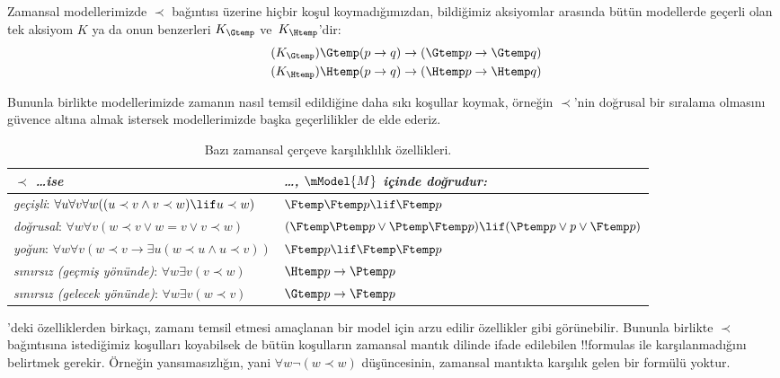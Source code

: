 



Zamansal modellerimizde $\prec$ bağıntısı üzerine hiçbir koşul
koymadığımızdan, bildiğimiz aksiyomlar arasında bütün modellerde geçerli olan
tek aksiyom $K$ ya da onun benzerleri $K_{\Gtemp}$ ve~$K_{\Htemp}$'dir:
\begin{align*}
\tag{$K_{\Gtemp}$}  \Gtemp (p \to q) & \to (\Gtemp p \to \Gtemp q)\\
\tag{$K_{\Htemp}$}  \Htemp (p \to q) & \to (\Htemp p \to \Htemp q)
\end{align*}

Bununla birlikte modellerimizde zamanın nasıl temsil edildiğine daha sıkı
koşullar koymak, örneğin $\prec$'nin doğrusal bir sıralama olmasını güvence
altına almak istersek modellerimizde başka geçerlilikler de elde ederiz.

\begin{table}[t]
  \begin{tabular}{| p{} || p{} |}
    \hline
    {\emph{$\prec$ \dots ise}} & {\emph{\dots, $\mModel{M}$ içinde doğrudur:}} \\
    \hline \hline
    \emph{geçişli}: \newline
    $\forall u \forall v \forall w ((u \prec v \land v \prec w) \lif u \prec w)$ & 
    $\Ftemp \Ftemp p \lif \Ftemp p$  \\
    \hline 
    \emph{doğrusal}: \newline
    $\forall w \forall v (w \prec v \lor w = v \lor v \prec w)$ &  
    $(\Ftemp \Ptemp p \lor \Ptemp \Ftemp p) \lif (\Ptemp p \lor p \lor \Ftemp p)$\\
    \hline
    \emph{yoğun}: \newline
    $\forall w \forall v (w \prec v \to \exists u(w \prec u \land u \prec v))$ &  
    $\Ftemp p \lif \Ftemp \Ftemp p$ \\
    \hline
    \emph{sınırsız (geçmiş yönünde)}: \newline
    $\forall w \exists v( v \prec w)$ &  
    $\Htemp p \to \Ptemp p$ \\
    \hline
    \emph{sınırsız (gelecek yönünde)}: \newline
    $\forall w \exists v( w \prec v)$ &  
    $\Gtemp p \to \Ftemp p$ \\
    \hline
  \end{tabular}
  \caption{Bazı zamansal çerçeve karşılıklılık özellikleri.}
\end{table} 

'deki özelliklerden birkaçı, zamanı temsil etmesi
amaçlanan bir model için arzu edilir özellikler gibi görünebilir. Bununla
birlikte $\prec$ bağıntısına istediğimiz koşulları koyabilsek de bütün
koşulların zamansal mantık dilinde ifade edilebilen !!{formula}s ile
karşılanmadığını belirtmek gerekir. Örneğin yansımasızlığın, yani
$\forall w\lnot(w\prec w)$ düşüncesinin, zamansal mantıkta karşılık gelen
bir formülü yoktur.

